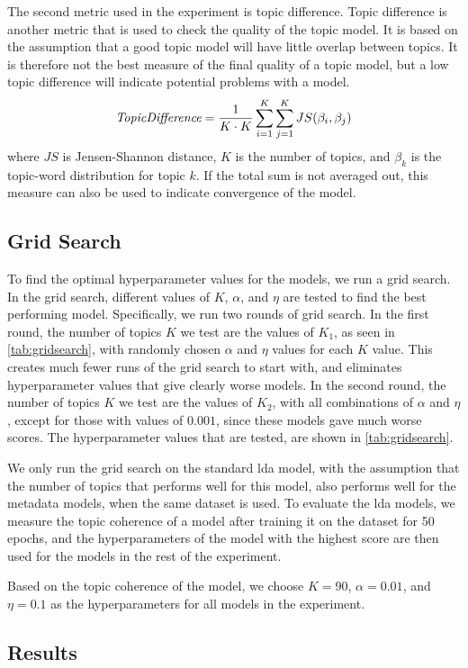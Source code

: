 The second metric used in the experiment is topic difference.
Topic difference is another metric that is used to check the quality of the topic model.
It is based on the assumption that a good topic model will have little overlap between topics.
It is therefore not the best measure of the final quality of a topic model, but a low topic difference will indicate potential problems with a model.
\begin{equation}
	\emph{TopicDifference} = \frac{1}{K \cdot K} \sum_{i=1}^{K} \sum_{j=1}^{K} JS(\beta_{i},\beta_{j})
\end{equation}
\noindent where $JS$ is Jensen-Shannon distance, $K$ is the number of topics, and $\beta_{k}$ is the topic-word distribution for topic $k$.
If the total sum is not averaged out, this measure can also be used to indicate convergence of the model.

\subsection{Grid Search}\label{sec:experiment_gridsearch}
To find the optimal hyperparameter values for the models, we run a grid search.
In the grid search, different values of $K$, $\alpha$, and $\eta$ are tested to find the best performing model.
Specifically, we run two rounds of grid search.
In the first round, the number of topics $K$ we test are the values of $K_1$, as seen in \autoref{tab:gridsearch}, with randomly chosen $\alpha$ and $\eta$ values for each $K$ value.
This creates much fewer runs of the grid search to start with, and eliminates hyperparameter values that give clearly worse models.
In the second round, the number of topics $K$ we test are the values of $K_2$, with all combinations of $\alpha$ and $\eta$, except for those with values of $0.001$, since these models gave much worse scores.
The hyperparameter values that are tested, are shown in \autoref{tab:gridsearch}.

We only run the grid search on the standard \gls{lda} model, with the assumption that the number of topics that performs well for this model, also performs well for the metadata models, when the same dataset is used.
To evaluate the \gls{lda} models, we measure the topic coherence of a model after training it on the dataset for 50 epochs, and the hyperparameters of the model with the highest score are then used for the models in the rest of the experiment.

Based on the topic coherence of the model, we choose $K = 90$, $\alpha = 0.01$, and $\eta = 0.1$ as the hyperparameters for all models in the experiment.



\subsection{Results}\label{sec:results}


